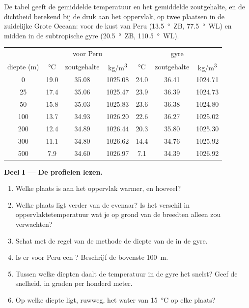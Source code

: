 \begin{problem}
\label{pb:g10:layered-ocean:1}
De tabel geeft de gemiddelde temperatuur en het gemiddelde zoutgehalte, en de
dichtheid berekend bij de druk aan het oppervlak, op twee plaatsen in de
zuidelijke Grote Oceaan: voor de kust van Peru (\qty{13.5}{\degree}~ZB,
\qty{77.5}{\degree}~WL) en midden in de subtropische gyre (\qty{20.5}{\degree}~ZB, \qty{110.5}{\degree}~WL).

\begin{center}
\small
\begin{tabular}{c|ccc|ccc}
\hline
 & \multicolumn{3}{c|}{voor Peru} & \multicolumn{3}{c}{gyre} \\
diepte (\unit{m}) & \unit{\degreeCelsius} & zoutgehalte & \unit{kg/m^3} & \unit{\degreeCelsius} & zoutgehalte & \unit{kg/m^3} \\
\hline
0 & 19.0 & 35.08 & 1025.08 & 24.0 & 36.41 & 1024.71 \\
25 & 17.4 & 35.06 & 1025.47 & 23.9 & 36.39 & 1024.73 \\
50 & 15.8 & 35.03 & 1025.83 & 23.6 & 36.38 & 1024.80 \\
100 & 13.7 & 34.93 & 1026.20 & 22.6 & 36.27 & 1025.02 \\
200 & 12.4 & 34.89 & 1026.44 & 20.3 & 35.80 & 1025.30 \\
300 & 11.1 & 34.80 & 1026.62 & 14.4 & 34.76 & 1025.92 \\
500 & 7.9 & 34.60 & 1026.97 & 7.1 & 34.39 & 1026.92 \\
\hline
\end{tabular}
\end{center}

\medskip
\noindent\textbf{Deel I --- De profielen lezen.}
\begin{enumerate}
  \item Welke plaats is aan het oppervlak warmer, en hoeveel?
  \item Welke plaats ligt verder van de evenaar? Is het verschil in
        oppervlaktetemperatuur wat je op grond van de breedten alleen zou verwachten?
  \item Schat met de regel van de methode de diepte van de 
        in de gyre.
  \item Is er voor Peru een ? Beschrijf de bovenste \qty{100}{m}.
  \item Tussen welke diepten daalt de temperatuur in de gyre het snelst?
        Geef de snelheid, in graden per honderd meter.
  \item Op welke diepte ligt, ruwweg, het water van \qty{15}{\degreeCelsius} op
        elke plaats?
\end{enumerate}


\end{problem}
